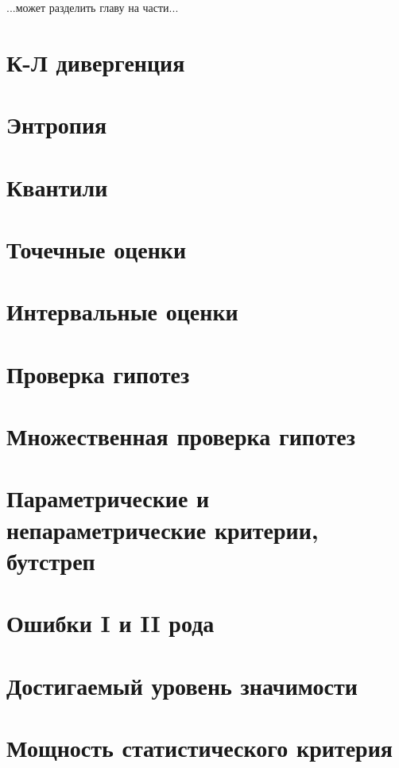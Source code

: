 ...может разделить главу на части...


\section{К-Л дивергенция}


\section{Энтропия}


\section{Квантили}


\section{Точечные оценки}


\section{Интервальные оценки}


\section{Проверка гипотез}


\section{Множественная проверка гипотез}


\section{Параметрические и непараметрические критерии, бутстреп}


\section{Ошибки I и II рода}


\section{Достигаемый уровень значимости}


\section{Мощность статистического критерия}


